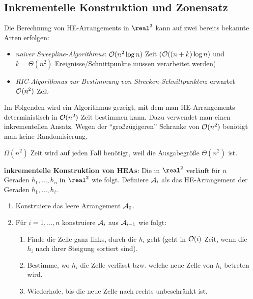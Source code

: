 \pagebreak

\subsection{%
    Inkrementelle Konstruktion und Zonensatz%
}

Die Berechnung von HE-Arrangements in $\real^2$ kann auf zwei bereits bekannte Arten erfolgen:
\begin{itemize}
    \item
    \emph{naiver Sweepline-Algorithmus}:
    $\mathcal{O}(n^2 \log n)$ Zeit ($\mathcal{O}((n+k) \log n)$ und $k = \Theta(n^2)$ Ereignisse/Schnittpunkte
    müssen verarbeitet werden)

    \item
    \emph{RIC-Algorithmus zur Bestimmung von Strecken-Schnittpunkten}:
    erwartet $\mathcal{O}(n^2)$ Zeit
\end{itemize}
Im Folgenden wird ein Algorithmus gezeigt, mit dem man HE-Arrangements deterministisch in
$\mathcal{O}(n^2)$ Zeit bestimmen kann.
Dazu verwendet man einen inkrementellen Ansatz.
Wegen der "`großzügigeren"' Schranke von $\mathcal{O}(n^2)$ benötigt man keine Randomisierung.

$\Omega(n^2)$ Zeit wird auf jeden Fall benötigt, weil die Ausgabegröße $\Theta(n^2)$ ist.

\linie

\textbf{inkrementelle Konstruktion von HEAs}:
Die  in $\real^2$ verläuft für $n$ Geraden
$h_1, \dotsc, h_n$ in $\real^2$ wie folgt.
Definiere $\mathcal{A}_i$ als das HE-Arrangement der Geraden $h_1, \dotsc, h_i$.
\begin{enumerate}
    \item
    Konstruiere das leere Arrangement $\mathcal{A}_0$.

    \item
    Für $i = 1, \dotsc, n$ konstruiere $\mathcal{A}_i$ aus $\mathcal{A}_{i-1}$ wie folgt:
    \begin{enumerate}
        \item
        Finde die Zelle ganz links, durch die $h_i$ geht
        (geht in $\mathcal{O}(i)$ Zeit, wenn die $h_i$ nach ihrer Steigung sortiert sind).

        \item
        Bestimme, wo $h_i$ die Zelle verlässt bzw. welche neue Zelle von $h_i$ betreten wird.

        \item
        Wiederhole, bis die neue Zelle nach rechts unbeschränkt ist.
    \end{enumerate}
\end{enumerate}

